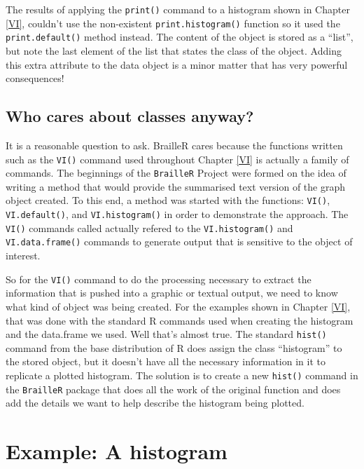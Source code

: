 \documentclass[
]{book}
\begin{document}
The results of applying the \texttt{print()} command to a histogram shown in Chapter \ref{VI}, couldn't use the non-existent \texttt{print.histogram()} function so it used the \texttt{print.default()} method instead. The content of the object is stored as a ``list'', but note the last element of the list that states the class of the object. Adding this extra attribute to the data object is a minor matter that has very powerful consequences!

\hypertarget{who-cares-about-classes-anyway}{%
\subsection{Who cares about classes anyway?}\label{who-cares-about-classes-anyway}}

It is a reasonable question to ask.
BrailleR cares because the functions written such as the \texttt{VI()} command used throughout Chapter \ref{VI} is actually a family of commands.
The beginnings of the \texttt{BrailleR} Project were formed on the idea of writing a method that would provide the summarised text version of the graph object created. To this end, a method was started with the functions: \texttt{VI()}, \texttt{VI.default()}, and \texttt{VI.histogram()} in order to demonstrate the approach.
The \texttt{VI()} commands called actually refered to the \texttt{VI.histogram()} and \texttt{VI.data.frame()} commands to generate output that is sensitive to the object of interest.

So for the \texttt{VI()} command to do the processing necessary to extract the information that is pushed into a graphic or textual output, we need to know what kind of object was being created. For the examples shown in Chapter \ref{VI}, that was done with the standard R commands used when creating the histogram and the data.frame we used. Well that's almost true. The standard \texttt{hist()} command from the base distribution of R does assign the class ``histogram'' to the stored object, but it doesn't have all the necessary information in it to replicate a plotted histogram. The solution is to create a new \texttt{hist()} command in the \texttt{BrailleR} package that does all the work of the original function and does add the details we want to help describe the histogram being plotted.

\hypertarget{example-a-histogram}{%
\section{Example: A histogram}\label{example-a-histogram}}
\end{document}
